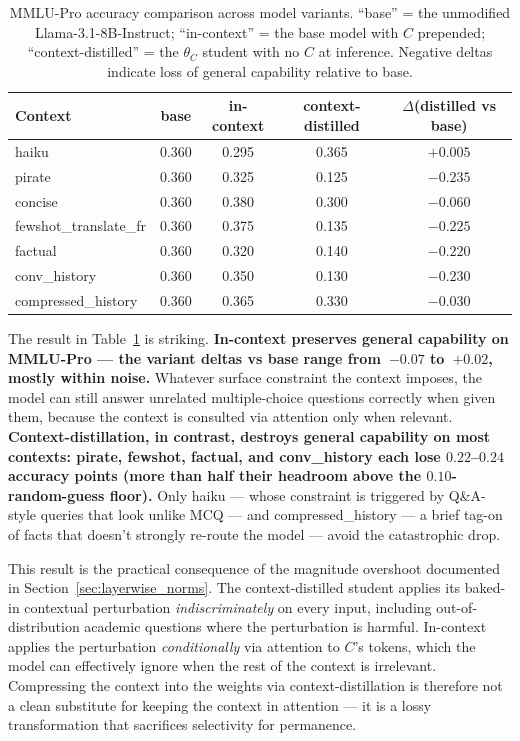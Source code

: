 \documentclass{article}
\begin{document}
\begin{table}[t]
\centering
\caption{MMLU-Pro accuracy comparison across model variants.
``base'' = the unmodified Llama-3.1-8B-Instruct; ``in-context'' = the
base model with $C$ prepended; ``context-distilled'' = the
$\theta_C$ student with no $C$ at inference. Negative deltas indicate
loss of general capability relative to base.}
\label{tab:mmlu}
\small
\begin{tabular}{lcccc}
\toprule
Context & base & in-context & context-distilled & $\Delta$(distilled vs base) \\
\midrule
haiku                  & 0.360 & 0.295 & 0.365 & $+0.005$ \\
pirate                 & 0.360 & 0.325 & 0.125 & $\mathbf{-0.235}$ \\
concise                & 0.360 & 0.380 & 0.300 & $-0.060$ \\
fewshot\_translate\_fr & 0.360 & 0.375 & 0.135 & $\mathbf{-0.225}$ \\
factual                & 0.360 & 0.320 & 0.140 & $\mathbf{-0.220}$ \\
conv\_history          & 0.360 & 0.350 & 0.130 & $\mathbf{-0.230}$ \\
compressed\_history    & 0.360 & 0.365 & 0.330 & $-0.030$ \\
\bottomrule
\end{tabular}
\end{table}

The result in Table~\ref{tab:mmlu} is striking. \textbf{In-context
preserves general capability on MMLU-Pro --- the variant deltas vs base
range from~$-0.07$ to~$+0.02$, mostly within noise.} Whatever surface
constraint the context imposes, the model can still answer
unrelated multiple-choice questions correctly when given them, because
the context is consulted via attention only when relevant.
\textbf{Context-distillation, in contrast, destroys general capability
on most contexts: pirate, fewshot, factual, and conv\_history each lose
$0.22$--$0.24$ accuracy points (more than half their headroom above the
$0.10$-random-guess floor).} Only haiku --- whose constraint is
triggered by Q\&A-style queries that look unlike MCQ --- and
compressed\_history --- a brief tag-on of facts that doesn't strongly
re-route the model --- avoid the catastrophic drop.

This result is the practical consequence of the magnitude overshoot
documented in Section~\ref{sec:layerwise_norms}. The
context-distilled student applies its baked-in contextual perturbation
\emph{indiscriminately} on every input, including out-of-distribution
academic questions where the perturbation is harmful. In-context
applies the perturbation \emph{conditionally} via attention to $C$'s
tokens, which the model can effectively ignore when the rest of the
context is irrelevant. Compressing the context into the weights via
context-distillation is therefore not a clean substitute for keeping
the context in attention --- it is a lossy transformation that
sacrifices selectivity for permanence.
\end{document}
